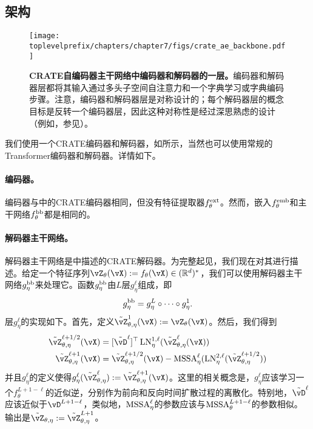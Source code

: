 \documentclass[../../book-main.tex]{subfiles}
\begin{document}
\subsection{架构}\label{sub:image_completion_architecture}

\begin{figure}
    \centering 
    \texttt{[image: \\toplevelprefix/chapters/chapter7/figs/crate\_ae\_backbone.pdf]}
    \caption{\small\textbf{CRATE自编码器主干网络中编码器和解码器的一层。}编码器和解码器层都将其输入通过多头子空间自注意力和一个字典学习或字典编码步骤。注意，编码器和解码器层是对称设计的；每个解码器层的概念目标是反转一个编码器层，因此这种对称性是经过深思熟虑的设计（例如，参见）。}
\end{figure}

我们使用一个CRATE编码器和解码器，如所示，当然也可以使用常规的Transformer编码器和解码器。详情如下。

\paragraph{编码器。} 编码器与中的CRATE编码器相同，但没有特征提取器\(f_{\theta}^{\mathrm{ext}}\)。然而，嵌入\(f_{\theta}^{\mathrm{emb}}\)和主干网络\(f_{\theta}^{\mathrm{bb}}\)都是相同的。

\paragraph{解码器主干网络。} 解码器主干网络是中描述的CRATE解码器。为完整起见，我们现在对其进行描述。给定一个特征序列\(\vZ_{\theta}(\vX) := f_{\theta}(\vX) \in (\R^{d})^{*}\)，我们可以使用解码器主干网络\(g_{\eta}^{\mathrm{bb}}\)来处理它。函数\(g_{\eta}^{\mathrm{bb}}\)由\(L\)层\(g_{\eta}^{\ell}\)组成，即
\begin{equation}
    g_{\eta}^{\mathrm{bb}} = g_{\eta}^{L} \circ \cdots \circ g_{\eta}^{1}.
\end{equation}
层\(g_{\eta}^{\ell}\)的实现如下。首先，定义\(\tilde{\vZ}_{\theta, \eta}^{1}(\vX) := \vZ_{\theta}(\vX)\)。然后，我们得到
\begin{align}
    \tilde{\vZ}_{\theta, \eta}^{\ell + 1/2}(\vX) 
    &= [\tilde{\vD}^{\ell}]^{\top}\LN_{\eta}^{1, \ell}(\tilde{\vZ}_{\theta, \eta}^{\ell}(\vX)) \\ 
    \tilde{\vZ}_{\theta, \eta}^{\ell + 1}(\vX)
    &= \tilde{\vZ}_{\theta, \eta}^{\ell + 1/2}(\vX) - \MSSA_{\eta}^{\ell}(\LN_{\eta}^{2, \ell}(\tilde{\vZ}_{\theta, \eta}^{\ell + 1/2}))
\end{align}
并且\(g_{\eta}^{\ell}\)的定义使得\(g_{\eta}^{\ell}(\tilde{\vZ}_{\theta, \eta}^{\ell}) := \tilde{\vZ}_{\theta, \eta}^{\ell + 1}(\vX)\)。这里的相关概念是，\(g_{\eta}^{\ell}\)应该学习一个\(f_{\theta}^{L + 1 - \ell}\)的近似逆，分别作为前向和反向时间扩散过程的离散化。特别地，\(\tilde{\vD}^{\ell}\)应该近似于\(\vD^{L + 1 - \ell}\)，类似地，\(\operatorname{MSSA}_{\eta}^{\ell}\)的参数应该与\(\operatorname{MSSA}_{\theta}^{L + 1 - \ell}\)的参数相似。输出是\(\tilde{\vZ}_{\theta, \eta} := \tilde{\vZ}_{\theta, \eta}^{L + 1}\)。
\end{document}
